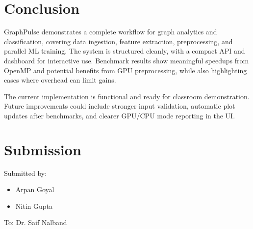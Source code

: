 \documentclass[11pt]{article}
\let\oldsection\section
\renewcommand{\section}{\clearpage\oldsection}
\begin{document}
\section{Conclusion}
GraphPulse demonstrates a complete workflow for graph analytics and classification, covering data ingestion, feature extraction, preprocessing, and parallel ML training. The system is structured cleanly, with a compact API and dashboard for interactive use. Benchmark results show meaningful speedups from OpenMP and potential benefits from GPU preprocessing, while also highlighting cases where overhead can limit gains.

The current implementation is functional and ready for classroom demonstration. Future improvements could include stronger input validation, automatic plot updates after benchmarks, and clearer GPU/CPU mode reporting in the UI.

\section*{Submission}
Submitted by:
\begin{itemize}
  \item Arpan Goyal
  \item Nitin Gupta
\end{itemize}

To: Dr. Saif Nalband
\end{document}
